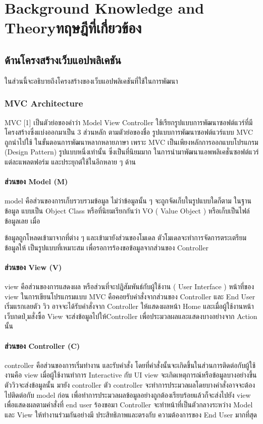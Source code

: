 \chapter{\ifenglish Background Knowledge and Theory\else ทฤษฎีที่เกี่ยวข้อง\fi}

\section{ด้านโครงสร้างเว็บแอปพลิเคชัน}

ในส่วนนี้จะอธิบายถึงโครงสร้างของเว็บแอปพลิเคชันที่ใช้ในการพัฒนา
\subsection{MVC Architecture}

MVC [1] เป็นตัวย่อของคําว่า Model View Controller ใช้เรียกรูปแบบการพัฒนาซอฟต์แวร์ที่มีโครงสร้างซึ่งแบ่งออกมาเป็น 3 ส่วนหลัก ตามตัวย่อของชื่อ รูปแบบการพัฒนาซอฟต์แวร์แบบ MVC ถูกนําไปใช้
ในขั้นตอนการพัฒนาหลากหลายภาษา เพราะ MVC เป็นเพียงหลักการออกแบบโปรแกรม (Design Pattern) รูปแบบหนึ่งเท่านั้น ซึ่งเป็นที่นิยมมาก ในการนํามาพัฒนาแอพพลิเคชั่นซอฟต์แวร์แต่ละแพลตฟอร์ม
และประยุกต์ใช้ในอีกหลาย ๆ ด้าน

\subsubsection{ส่วนของ Model (M)}
model คือส่วนของการเก็บรวบรวมข้อมูล ไม่ว่าข้อมูลนั้น ๆ จะถูกจัดเก็บในรูปแบบใดก็ตาม ในฐานข้อมูล
แบบเป็น Object Class หรือที่นิยมเรียกกันว่า VO ( Value Object ) หรือเก็บเป็นไฟล์ข้อมูลเลย เมื่อ

ข้อมูลถูกโหลดเข้ามาจากที่ต่าง ๆ และเข้ามายังส่วนของโมเดล ตัวโมเดลจะทําการจัดการตระเตรียมข้อมูลให้
เป็นรูปแบบที่เหมาะสม เพื่อรอการร้องขอข้อมูลจากส่วนของ Controller

\subsubsection{ส่วนของ View (V)}
view คือส่วนของการแสดงผล หรือส่วนที่จะปฏิสัมพันธ์กับผู้ใช้งาน ( User Interface ) หน้าที่ของ view
ในการเขียนโปรแกรมแบบ MVC คือคอยรับคําสั่งจากส่วนของ Controller และ End User เริ่มแรกเลยตัว
วิว อาจจะได้รับคําสั่งจาก Controller ให้แสดงผลหน้า Home และเมื่อผู้ใช้งานหน้าเว็บกดป่ ุมสั่งซื้อ View
จะส่งข้อมูลไปให้Controller เพื่อประมวลผลและแสดงบางอย่างจาก Action นั้น

\subsubsection{ส่วนของ Controller (C)}
controller คือส่วนของการเริ่มทํางาน และรับคําสั่ง โดยที่คําสั่งนั้นจะเกิดขึ้นในส่วนการติดต่อกับผู้ใช้งานคือ
view เมื่อผู้ใช้งานทําการ Interactive กับ UI view จะเกิดเหตุการณ์หรือข้อมูลบางอย่างขึ้น ตัววิวจะส่งข้อมูลนั้น มายัง controller ตัว controller จะทําการประมวลผลโดยบางคําสั่งอาจจะต้องไปติดต่อกับ model
ก่อน เพื่อทําการประมวลผลข้อมูลอย่างถูกต้องเรียบร้อยแล้วก็จะส่งไปยัง view เพื่อแสดงผลตามคําสั่งที่ end
user ร้องขอมา Controller จะทําหน้าที่เป็นตัวกลางระหว่าง Model และ View ให้ทํางานร่วมกันอย่างมี
ประสิทธิภาพและตรงกับ ความต้องการของ End User มากที่สุด
